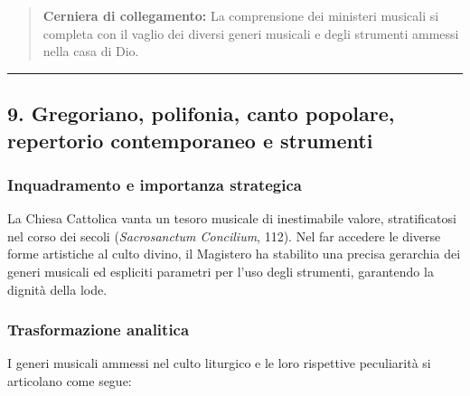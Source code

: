 \documentclass[12pt,a4paper]{article}
\begin{document}
	\begin{quote}
		\textbf{Cerniera di collegamento:} La comprensione dei ministeri musicali si completa con il vaglio dei diversi generi musicali e degli strumenti ammessi nella casa di Dio.
	\end{quote}
	
	\begin{center}\rule{0.5\linewidth}{0.5pt}\end{center}
	
	\subsection{9. Gregoriano, polifonia, canto popolare, repertorio contemporaneo e strumenti}\label{gregoriano-polifonia-canto-popolare-repertorio-contemporaneo-e-strumenti}
	
	\subsubsection{Inquadramento e importanza strategica}\label{inquadramento-e-importanza-strategica-8}
	
	La Chiesa Cattolica vanta un tesoro musicale di inestimabile valore, stratificatosi nel corso dei secoli (\emph{Sacrosanctum Concilium}, 112). Nel far accedere le diverse forme artistiche al culto divino, il Magistero ha stabilito una precisa gerarchia dei generi musicali ed espliciti parametri per l'uso degli strumenti, garantendo la dignità della lode.
	
	\subsubsection{Trasformazione analitica}\label{trasformazione-analitica-8}
	
	I generi musicali ammessi nel culto liturgico e le loro rispettive peculiarità si articolano come segue:
	
\end{document}
